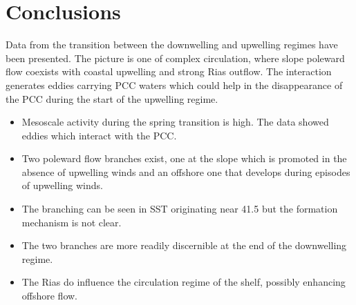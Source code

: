 \section{Conclusions}
Data from the transition between the downwelling and upwelling
regimes have been presented. The picture is one of complex
circulation, where slope poleward flow coexists with coastal
upwelling and strong Rias outflow. The interaction generates
eddies carrying PCC waters which could help in the disappearance
of the PCC during the start of the upwelling regime.
\begin{itemize}
\item Mesoscale activity during the spring transition is high.
The data showed eddies which interact with the PCC.
\item Two poleward flow branches exist, one at the slope which
is promoted in the absence of upwelling winds and an offshore one
that develops during episodes of upwelling winds.
\item The branching can be seen in SST originating near 41.5\deg
but the formation mechanism is not clear.
\item The two branches are more readily discernible at the end of
the downwelling regime.
\item The Rias do influence the circulation regime of the shelf,
possibly enhancing offshore flow.

\end{itemize}
